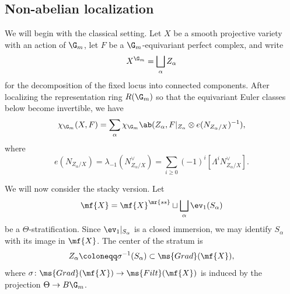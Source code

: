 \subsection{Non-abelian localization}%
\label{sub:Non-abelian localization}

We will begin with the classical setting. Let \(X\) be a smooth projective variety with an action of \(\G_m\), let \(F\) be a \(\G_m\)-equivariant perfect complex, and write
\[
    X^{\G_m}=\bigsqcup_\alpha Z_\alpha
\]
for the decomposition of the fixed locus into connected components. After localizing the representation ring \(R(\G_m)\) so that the equivariant Euler classes below become invertible, we have
\[
    \chi_{\G_m}(X,F)
    =
    \sum_\alpha
    \chi_{\G_m}\ab(
        Z_\alpha,
        F|_{Z_\alpha}\otimes e(N_{Z_\alpha/X})^{-1}
    ),
\]
where
\[
    e(N_{Z_\alpha/X})
    =
    \lambda_{-1}(N_{Z_\alpha/X}^\vee)
    =
    \sum_{i\geq0}(-1)^i[\Lambda^iN_{Z_\alpha/X}^\vee].
\]

We will now consider the stacky version. Let
\[
    \mf{X}
    =
    \mf{X}^{\mr{ss}}
    \sqcup
    \bigsqcup_\alpha\ev_1(S_\alpha)
\]
be a \(\Theta\)-stratification. Since \(\ev_1|_{S_\alpha}\) is a closed immersion, we may identify \(S_\alpha\) with its image in \(\mf{X}\). The center of the stratum is
\[
    Z_\alpha\coloneqq\sigma^{-1}(S_\alpha)\subset\ms{Grad}(\mf{X}),
\]
where \(\sigma\colon\ms{Grad}(\mf{X})\to\ms{Filt}(\mf{X})\) is induced by the projection \(\Theta\to B\G_m\).

